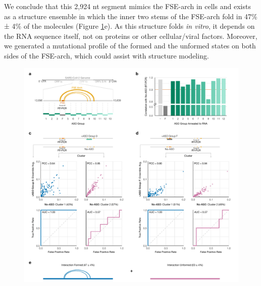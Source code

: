 \documentclass[main.tex]{subfiles}
\begin{document}
We conclude that this 2,924 nt segment mimics the FSE-arch in cells and exists as a structure ensemble in which the inner two stems of the FSE-arch fold in 47\% ± 4\% of the molecules (Figure \ref{tiles}e).
As this structure folds \textit{in vitro}, it depends on the RNA sequence itself, not on proteins or other cellular/viral factors.
Moreover, we generated a mutational profile of the formed and the unformed states on both sides of the FSE-arch, which could assist with structure modeling.

\begin{figure}[ht]
	\includegraphics[width=\textwidth]{../MainFigures/sars2-tile/sars2-tile.pdf}
	\caption{}
	\label{tiles}
\end{figure}
\end{document}
